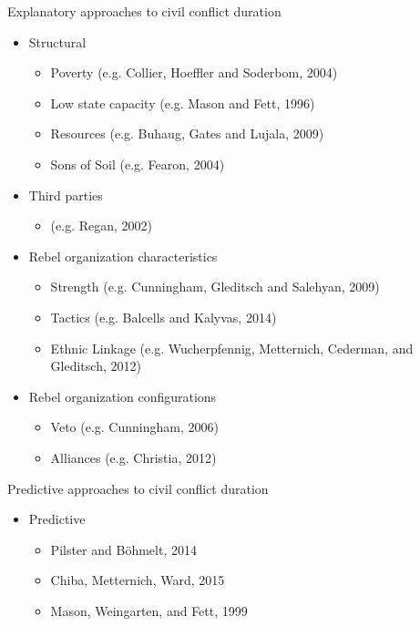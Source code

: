 \documentclass{beamer}
\begin{document}
\begin{frame}{Explanatory approaches to civil conflict duration}
\begin{itemize}

\item Structural 
\begin{itemize}
\item Poverty (e.g. Collier, Hoeffler and Soderbom, 2004)
\item Low state capacity (e.g. Mason and Fett, 1996)
\item Resources (e.g. Buhaug, Gates and Lujala, 2009)
\item Sons of Soil (e.g. Fearon, 2004)
\end{itemize}

\item Third parties
\begin{itemize}
\item (e.g. Regan, 2002)
\end{itemize}

\item Rebel organization characteristics
\begin{itemize}
\item Strength (e.g. Cunningham, Gleditsch and Salehyan, 2009)
\item Tactics (e.g. Balcells and Kalyvas, 2014)
\item Ethnic Linkage (e.g. Wucherpfennig, Metternich, Cederman, and Gleditsch, 2012)
\end{itemize}

\item Rebel organization configurations
\begin{itemize}
\item Veto (e.g. Cunningham, 2006)
\item Alliances (e.g. Christia, 2012)
\end{itemize}
\end{itemize}
\end{frame}


\begin{frame}{Predictive approaches to civil conflict duration}
\begin{itemize}

\item Predictive 
\begin{itemize}
\item Pilster and B\"{o}hmelt, 2014
\item Chiba, Metternich, Ward, 2015
\item Mason, Weingarten, and Fett, 1999
\end{itemize}
\end{itemize}
\end{frame}
\end{document}
